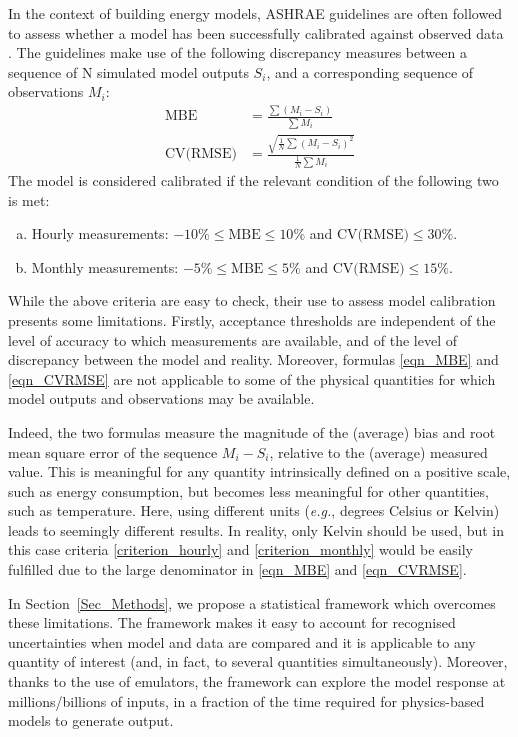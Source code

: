 \documentclass[preprint,12pt, sort&compress]{elsarticle}
\begin{document}
In the context of building energy models, ASHRAE guidelines \cite{ashrae2002} are often followed to assess whether a model has been successfully calibrated against observed data \cite{royapoor2015, hou2021}. The guidelines make use of the following discrepancy measures between a sequence of N simulated model outputs $S_i$, and a corresponding sequence of observations $M_i$:
\begin{align}
 \text{MBE}             &= \frac{\sum(M_i - S_i)}{\sum M_i} \label{eqn_MBE}\\[1ex]
 \text{CV(RMSE)}  &= \frac{\sqrt{\frac{1}{N} \sum(M_i - S_i)^2}}{\frac{1}{N} \sum M_i} \label{eqn_CVRMSE}
\end{align}
The model is considered calibrated if the relevant condition of the following two is met:
\begin{enumerate}[(a)]
\item Hourly measurements: $-10\% \leq \text{MBE} \leq 10\%$ and $\text{CV(RMSE)} \leq 30\%$. \label{criterion_hourly}
\item Monthly measurements:  $-5\% \leq \text{MBE} \leq  5\%$  and $\text{CV(RMSE)} \leq 15\%$.\label{criterion_monthly}
\end{enumerate}

While the above criteria are easy to check, their use to assess model calibration presents some limitations. Firstly, acceptance thresholds are independent of the level of accuracy to which measurements are available, and of the level of discrepancy between the model and reality. Moreover, formulas \eqref{eqn_MBE} and \eqref{eqn_CVRMSE} are not applicable to some of the physical quantities for which model outputs and observations may be available. 

Indeed, the two formulas measure the magnitude of the (average) bias and root mean square error of the sequence $M_i-S_i$, relative to the (average) measured value. This is meaningful for any quantity intrinsically defined on a positive scale, such as energy consumption, but becomes less meaningful for other quantities, such as temperature. Here, using different units (\textit{e.g.}, degrees Celsius or Kelvin) leads to seemingly different results. In reality, only Kelvin should be used, but in this case criteria \eqref{criterion_hourly} and \eqref{criterion_monthly} would be easily fulfilled due to the large denominator in \eqref{eqn_MBE} and \eqref{eqn_CVRMSE}.  

In Section~\ref{Sec_Methods}, we propose a statistical framework which overcomes these limitations. The framework makes it easy to account for recognised uncertainties when model and data are compared and it is applicable to any quantity of interest (and, in fact, to several quantities simultaneously). Moreover, thanks to the use of emulators, the framework can explore the model response at millions/billions of inputs, in a fraction of the time required for physics-based models to generate output. 
\end{document}
